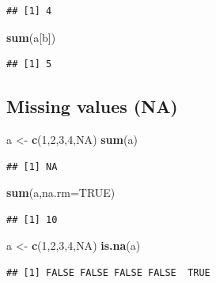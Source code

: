 \documentclass[]{article}
\newenvironment{Shaded}{\begin{snugshade}}{\end{snugshade}}
\newcommand{\KeywordTok}[1]{\textcolor[rgb]{0.13,0.29,0.53}{\textbf{{#1}}}}
\newcommand{\DataTypeTok}[1]{\textcolor[rgb]{0.13,0.29,0.53}{{#1}}}
\newcommand{\DecValTok}[1]{\textcolor[rgb]{0.00,0.00,0.81}{{#1}}}
\newcommand{\StringTok}[1]{\textcolor[rgb]{0.31,0.60,0.02}{{#1}}}
\newcommand{\OtherTok}[1]{\textcolor[rgb]{0.56,0.35,0.01}{{#1}}}
\newcommand{\NormalTok}[1]{{#1}}
\numberwithin{equation}{section}
\begin{document}
\begin{verbatim}
## [1] 4
\end{verbatim}

\begin{Shaded}
\begin{Highlighting}[]
\KeywordTok{sum}\NormalTok{(a[b])}
\end{Highlighting}
\end{Shaded}

\begin{verbatim}
## [1] 5
\end{verbatim}

\subsection{Missing values (NA)}\label{missing-values-na}

\begin{Shaded}
\begin{Highlighting}[]
\NormalTok{a <-}\StringTok{ }\KeywordTok{c}\NormalTok{(}\DecValTok{1}\NormalTok{,}\DecValTok{2}\NormalTok{,}\DecValTok{3}\NormalTok{,}\DecValTok{4}\NormalTok{,}\OtherTok{NA}\NormalTok{)}
\KeywordTok{sum}\NormalTok{(a)}
\end{Highlighting}
\end{Shaded}

\begin{verbatim}
## [1] NA
\end{verbatim}

\begin{Shaded}
\begin{Highlighting}[]
\KeywordTok{sum}\NormalTok{(a,}\DataTypeTok{na.rm=}\OtherTok{TRUE}\NormalTok{)}
\end{Highlighting}
\end{Shaded}

\begin{verbatim}
## [1] 10
\end{verbatim}

\begin{Shaded}
\begin{Highlighting}[]
\NormalTok{a <-}\StringTok{ }\KeywordTok{c}\NormalTok{(}\DecValTok{1}\NormalTok{,}\DecValTok{2}\NormalTok{,}\DecValTok{3}\NormalTok{,}\DecValTok{4}\NormalTok{,}\OtherTok{NA}\NormalTok{)}
\KeywordTok{is.na}\NormalTok{(a)}
\end{Highlighting}
\end{Shaded}

\begin{verbatim}
## [1] FALSE FALSE FALSE FALSE  TRUE
\end{verbatim}
\end{document}
